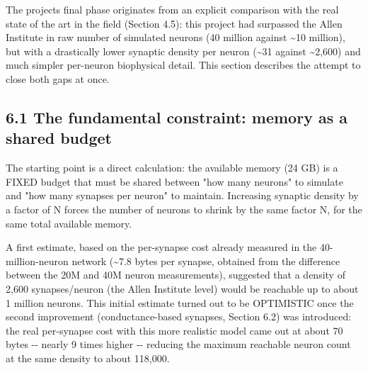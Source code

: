 \documentclass[
  english,
]{article}
\begin{document}
The project\textquotesingle s final phase originates from an explicit comparison with the real state of the art in the field (Section 4.5): this project had surpassed the Allen Institute in raw number of simulated neurons (40 million against \textasciitilde10 million), but with a drastically lower synaptic density per neuron (\textasciitilde31 against \textasciitilde2,600) and much simpler per-neuron biophysical detail. This section describes the attempt to close both gaps at once.

\subsection{6.1 The fundamental constraint: memory as a shared budget}\label{the-fundamental-constraint-memory-as-a-shared-budget}

The starting point is a direct calculation: the available memory (24 GB) is a FIXED budget that must be shared between "how many neurons" to simulate and "how many synapses per neuron" to maintain. Increasing synaptic density by a factor of N forces the number of neurons to shrink by the same factor N, for the same total available memory.

A first estimate, based on the per-synapse cost already measured in the 40-million-neuron network (\textasciitilde7.8 bytes per synapse, obtained from the difference between the 20M and 40M neuron measurements), suggested that a density of 2,600 synapses/neuron (the Allen Institute level) would be reachable up to about 1 million neurons. This initial estimate turned out to be OPTIMISTIC once the second improvement (conductance-based synapses, Section 6.2) was introduced: the real per-synapse cost with this more realistic model came out at about 70 bytes -\/- nearly 9 times higher -\/- reducing the maximum reachable neuron count at the same density to about 118,000.
\end{document}
